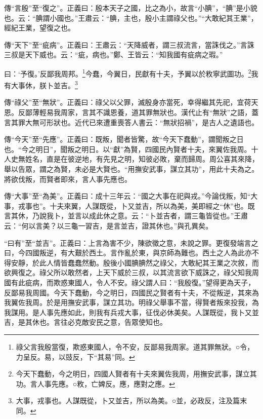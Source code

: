 {\noindent\zhuan{}\fzbyks 傳“言殷”至“復之”。正義曰：殷本天子之國，比之為小，故言“小腆”，“腆”是小貌也。云：“腆謂小國也。”王肅云：“腆，主也，殷小主謂祿父也。”“大敢紀其王業”，經紀王業，望復之也。 \par}

{\noindent\zhuan{}\fzbyks 傳“天下”至“疵病”。正義曰：王肅云：“天降威者，謂三叔流言，當誅伐之。”言誅三叔是天下威也。云：“疵，病也。”鄭、王皆云：“知我國有疵病之瑕。” \par}

曰：‘予復。’反鄙我周邦。\footnote{祿父言我殷當復，欺惑東國人，令不安，反鄙易我周家。道其罪無狀。○令，力呈反。易，以豉反，下“其易”同。}今蠢，今翼日，民獻有十夫，予翼以於敉寧武圖功。\footnote{今天下蠢動，今之明日，四國人賢者有十夫來翼佐我周，用撫安武事，謀立其功。言人事先應。○敉，亡婢反。應，應對之應。}我有大事休，朕卜並吉。\footnote{大事，戎事也。人謀既從，卜又並吉，所以為美。○並，必政反，注及篇末同。}

{\noindent\zhuan{}\fzbyks 傳“祿父”至“無狀”。正義曰：祿父以父罪，滅殷身亦當死，幸得繼其先祀，宜荷天恩。反鄙薄輕易我周家，言其不識恩養，道其罪無狀也。漢代止有“無狀”之語，蓋言其罪大無可形狀也。近代已來遭重喪答人書云：“無狀招禍”，是古人之遺語也。 \par}

{\noindent\zhuan{}\fzbyks 傳“今天”至“先應”。正義曰：既叛，聞者皆驚，故“今天下蠢動”，謂聞叛之日也。“今之明日”，聞叛之明日。以“獻”為賢，四國民內賢者十夫，來翼佐我周。十人史無姓名，直是在彼逆地，有先見之明，知彼必敗，棄而歸周。周公喜其來降，舉以告眾，謂之為賢，未必是大賢也。“用撫安武事，謀立其功”，用此十夫為之。將欲伐叛，而賢者即來，言人事先應也。 \par}

{\noindent\zhuan{}\fzbyks 傳“大事”至“為美”。正義曰：成十三年云：“國之大事在祀與戎。”今論伐叛，知“大事，戎事也”。十夫來翼，人謀既從，卜又並吉，所以為美，美即經之“休”也。既言其休，乃說我卜，並言以成此休之意。云：“卜並吉者，謂三龜皆從也。”王肅云：“何以言美？以三龜一習吉，是言並吉，證其休也。”與孔異矣。 \par}

{\noindent\shu{}\fzkt “曰有”至“並吉”。正義曰：上言為害不少，陳欲徵之意，未說之罪。更復發端言之曰，今四國叛逆，有大艱於西土。言作亂於東，與京師為難也。西土之人為此亦不得安靜，於此人情皆蠢蠢然動。殷後小國腆腆然之祿父，大敢紀其王業之次敘，而欲興復之。祿父所以敢然者，上天下威於三叔，以其流言欲下威誅之，祿父知我周國有此疵病，而欺惑東國人，令人不安。祿父謂人曰：“我殷復。”望得更為天子，反鄙易我周國。今天下蠢動，今之明日，四國民之賢者有十夫，不從叛逆，其來為我翼佐我周。於是用撫安武事，謀立其功。明祿父舉事不當，得賢者叛來投我，為我謀用。是人事先應如此，則我有兵戎大事，征伐必休美矣。人謀既從，我卜又並吉，是其休也。言往必克敵安民之意，告眾使知也。 \par}

